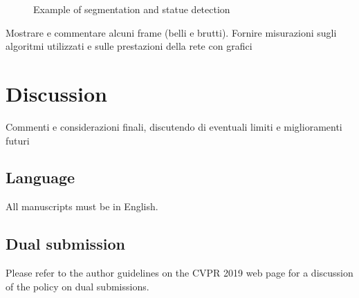 \documentclass[10pt,twocolumn,letterpaper]{article}
\begin{document}
\begin{figure}
    \centering
    \caption{Example of segmentation and statue detection}
    \label{fig:foobar}
\end{figure}


Mostrare e commentare alcuni frame (belli e brutti).
Fornire misurazioni sugli algoritmi utilizzati e sulle prestazioni della rete con grafici

\section{Discussion}

Commenti e considerazioni finali, discutendo di eventuali limiti e miglioramenti futuri




\subsection{Language}

All manuscripts must be in English.

\subsection{Dual submission}

Please refer to the author guidelines on the CVPR 2019 web page for a
discussion of the policy on dual submissions.
\end{document}
